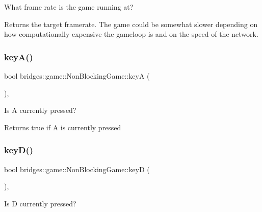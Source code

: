 What frame rate is the game running at? 

\begin{DoxyReturn}{Returns}
the target framerate. The game could be somewhat slower depending on how computationally expensive the gameloop is and on the speed of the network. 
\end{DoxyReturn}
\mbox{\label{classbridges_1_1game_1_1_non_blocking_game_af88089437e34df580b247cb27047fd14}} 
\subsubsection{\texorpdfstring{key\+A()}{keyA()}}
{\footnotesize\ttfamily bool bridges\+::game\+::\+Non\+Blocking\+Game\+::keyA (\begin{DoxyParamCaption}{ }\end{DoxyParamCaption})\hspace{0.3cm}{\ttfamily [inline]}, {\ttfamily [protected]}}



Is A currently pressed? 

\begin{DoxyReturn}{Returns}
true if A is currently pressed 
\end{DoxyReturn}
\mbox{\label{classbridges_1_1game_1_1_non_blocking_game_a932979445cc8acea618092b83b4a9756}} 
\subsubsection{\texorpdfstring{key\+D()}{keyD()}}
{\footnotesize\ttfamily bool bridges\+::game\+::\+Non\+Blocking\+Game\+::keyD (\begin{DoxyParamCaption}{ }\end{DoxyParamCaption})\hspace{0.3cm}{\ttfamily [inline]}, {\ttfamily [protected]}}



Is D currently pressed? 

